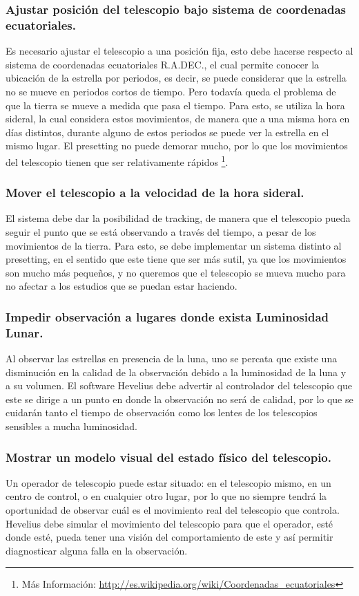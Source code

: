 \documentclass[letterpaper,spanish,10pt]{article}
\begin{document}
\subsubsection{Ajustar posici\'on del telescopio bajo sistema de coordenadas ecuatoriales.}
Es necesario ajustar el telescopio a una posici\'on fija, esto debe hacerse respecto al sistema de coordenadas ecuatoriales R.A.DEC., el cual permite conocer la ubicaci\'on de la estrella por periodos, es decir, se puede considerar que la estrella no se mueve en periodos cortos de tiempo. Pero todav\'ia queda el problema de que la tierra se mueve a medida que pasa el tiempo. Para esto, se utiliza la hora sideral, la cual considera estos movimientos, de manera que a una misma hora en d\'ias distintos, durante alguno de estos periodos se puede ver la estrella en el mismo lugar. El presetting no puede demorar mucho, por lo que los movimientos del telescopio tienen que ser relativamente r\'apidos \footnote{M\'as Informaci\'on: \url{http://es.wikipedia.org/wiki/Coordenadas_ecuatoriales}}.

\subsubsection{Mover el telescopio a la velocidad de la hora sideral.}
El sistema debe dar la posibilidad de tracking, de manera que el telescopio pueda seguir el punto que se est\'a observando a trav\'es del tiempo, a pesar de los movimientos de la tierra. Para esto, se debe implementar un sistema distinto al presetting, en el sentido que este tiene que ser m\'as sutil, ya que los movimientos son mucho m\'as peque\~nos, y no queremos que el telescopio se mueva mucho para no afectar a los estudios que se puedan estar haciendo.

\subsubsection{Impedir observaci\'on a lugares donde exista Luminosidad Lunar.}
Al observar las estrellas en presencia de la luna, uno se percata que existe una disminuci\'on en la calidad de la observaci\'on debido a la luminosidad de la luna y a su volumen. El software Hevelius debe advertir al controlador del telescopio que este se dirige a un punto en donde la observaci\'on no ser\'a de calidad, por lo que se cuidar\'an tanto el tiempo de observaci\'on como los lentes de los telescopios sensibles a mucha luminosidad.

\subsubsection{Mostrar un modelo visual del estado f\'isico del telescopio.}
Un operador de telescopio puede estar situado: en el telescopio mismo, en un centro de control, o en cualquier otro lugar, por lo que no siempre tendr\'a la oportunidad de observar cu\'al es el movimiento real del telescopio que controla. Hevelius debe simular el movimiento del telescopio para que el operador, est\'e donde est\'e, pueda tener una visi\'on del comportamiento de este y as\'i permitir diagnosticar alguna falla en la observaci\'on.
\end{document}
